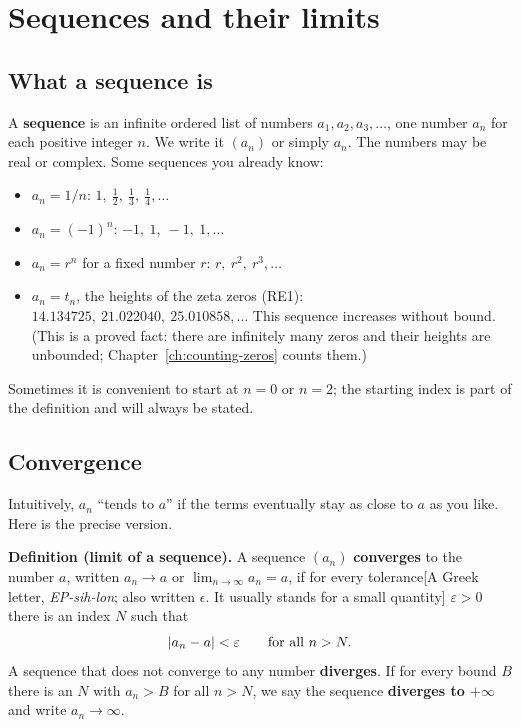 \section{Sequences and their limits}\label{sec:series-sequences}

\subsection{What a sequence is}

A \textbf{sequence} is an infinite ordered list of numbers $a_1,a_2,a_3,\dots$, one number $a_n$ for each positive integer $n$. We write it $(a_n)$ or simply $a_n$. The numbers may be real or complex. Some sequences you already know:
\begin{itemize}
\item $a_n=1/n$: $1,\ \tfrac12,\ \tfrac13,\ \tfrac14,\dots$
\item $a_n=(-1)^n$: $-1,\ 1,\ -1,\ 1,\dots$
\item $a_n=r^n$ for a fixed number $r$: $r,\ r^2,\ r^3,\dots$
\item $a_n=t_n$, the heights of the zeta zeros (RE1): $14.134725,\ 21.022040,\ 25.010858,\dots$ This sequence increases without bound. (This is a proved fact: there are infinitely many zeros and their heights are unbounded; Chapter~\ref{ch:counting-zeros} counts them.)
\end{itemize}
Sometimes it is convenient to start at $n=0$ or $n=2$; the starting index is part of the definition and will always be stated.

\subsection{Convergence}

Intuitively, $a_n$ ``tends to $a$'' if the terms eventually stay as close to $a$ as you like. Here is the precise version.

\textbf{Definition (limit of a sequence).} A sequence $(a_n)$ \textbf{converges} to the number $a$, written $a_n\to a$ or $\lim_{n\to\infty}a_n=a$, if for every tolerance[A Greek letter, \emph{EP-sih-lon}; also written $\epsilon$. It usually stands for a small quantity] $\varepsilon>0$ there is an index $N$ such that
\begin{equation}
\left\lvert a_n-a\right\rvert<\varepsilon\qquad\text{for all } n>N.
\label{eq:series-limit-def}
\end{equation}
A sequence that does not converge to any number \textbf{diverges}. If for every bound $B$ there is an $N$ with $a_n>B$ for all $n>N$, we say the sequence \textbf{diverges to $+\infty$} and write $a_n\to\infty$.

